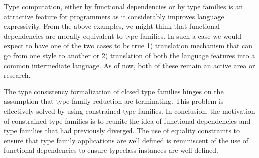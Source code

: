 \documentclass[format=acmsmall,manuscript,screen,nonacm,margin=1in,11pt]{acmart}
\begin{document}
Type computation, either by functional dependencies or by type families
is an attractive feature for programmers as it considerably improves language expressivity.
From the above examples, we might think that functional dependencies are morally equivalent to type families.
In such a case we would expect to have one of the two cases to be true
1) translation mechanism that can go from one style to another or 2)
translation of both the language features into a common intermediate language.
As of now, both of these remain an active area or research\cite{karachalias_elaboration_2017,sulzmann_understanding_2007}.

The type consistency formalization of closed type families hinges on the assumption that
type family reduction are terminating. This problem is effectively solved by using constrained type families.
In conclusion, the motivation of constrained type families is to reunite
the idea of functional dependencies and type families that had previously diverged.
The use of equality constraints to ensure that type family applications are well defined
is reminiscent of the use of functional dependencies to ensure typeclass instances are well defined.
\newpage


\end{document}
